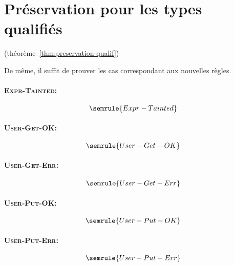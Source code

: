 \section{Préservation pour les types qualifiés}
\label{proof:preservation-qualif}

(théorème~\ref{thm:preservation-qualif})

De même, il suffit de prouver les cas correspondant aux nouvelles règles.

\paragraph{\textsc{Expr-Tainted}:} %
\[ \semrule{Expr-Tainted} \]
\paragraph{\textsc{User-Get-OK}:} %
\[ \semrule{User-Get-OK} \]
\paragraph{\textsc{User-Get-Err}:} %
\[ \semrule{User-Get-Err} \]
\paragraph{\textsc{User-Put-OK}:} %
\[ \semrule{User-Put-OK} \]
\paragraph{\textsc{User-Put-Err}:} %
\[ \semrule{User-Put-Err} \]
